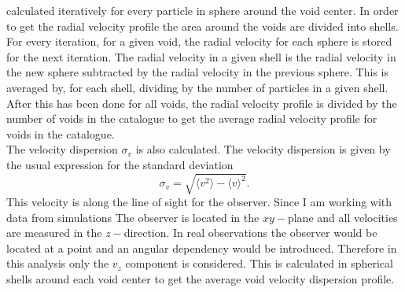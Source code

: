 calculated iteratively for every particle in sphere around the void center. In
order to get the radial velocity profile the area around the voids are divided into
shells. For every iteration, for a given void, the radial
velocity for each sphere is stored for the next iteration. The radial velocity in a given shell
is the radial velocity in the new sphere subtracted by
the radial velocity in the previous sphere. This is averaged by, for each shell,
dividing by the number of particles in a given shell. After this has
been done for all voids, the radial velocity profile is divided by the number of voids in the catalogue to get
the average radial velocity profile for voids in the catalogue.
\\\indent
The velocity dispersion $\sigma_v$ is also calculated. The velocity dispersion
is given by the usual expression for the standard deviation
\begin{equation}\label{eq:sigma_v}
    \sigma_{v} = \sqrt{\langle v^2 \rangle - \langle v\rangle^2}.
\end{equation}
This velocity is along the line of sight for the observer. Since I am working with data from simulations
The observer is located in the $xy-$plane and all velocities are measured in the $z-$direction. In real observations
the observer would be located at a point and an angular dependency would be introduced.
Therefore in this analysis only the $v_z$ component
is considered. This is calculated in spherical shells around each void center to
get the average void velocity dispersion profile.
